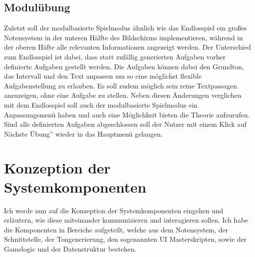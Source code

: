 \subsection{Modulübung}
Zuletzt soll der modulbasierte Spielmodus ähnlich wie das Endlosspiel ein großes Notensystem in der unteren Hälfte des Bildschirms implementieren, während in der oberen Häfte alle relevanten Informationen angezeigt werden. Der Unterschied zum Endlosspiel ist dabei, dass statt zufällig generierten Aufgaben vorher definierte Aufgaben gestellt werden. Die Aufgaben können dabei den Grundton, das Intervall und den Text anpassen um so eine möglichst flexible Aufgabenstellung zu erlauben. Es soll zudem möglich sein reine Textpassagen anzuzeigen, ohne eine Aufgabe zu stellen. Neben diesen Änderungen verglichen mit dem Endlosspiel soll auch der modulbasierte Spielmodus ein Anpassungsmenü haben und auch eine Möglichkeit bieten die Theorie aufzurufen. Sind alle definierten Aufgaben abgeschlossen soll der Nutzer mit einem Klick auf \glqq Nächste Übung'' wieder in das Hauptmenü gelangen. 

\section{Konzeption der Systemkomponenten}


%

Ich werde nun auf die Konzeption der Systemkomponenten eingehen und erläutern, wie diese miteinander kommunizieren und interagieren sollen. Ich habe die Komponenten in Bereiche aufgeteilt, welche aus dem Notensystem, der Schnittstelle, der Tongenerierung, den sogenannten UI Masterskripten, sowie der Gamelogic und der Datenstruktur bestehen.\\

